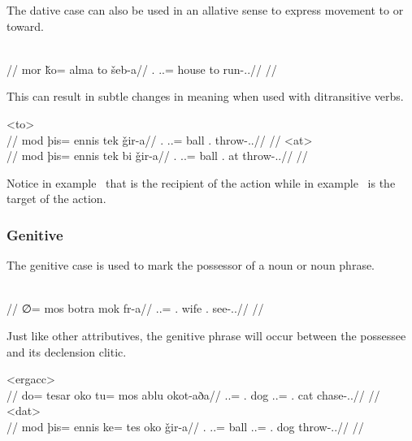 The dative case can also be used in an allative sense to express movement to or toward.

	\begingl
		\glpreamble{}\\
		//
		\gla mor ǩo= alma to šeb-a//
		\glb \Fps.\An{} \In.\Sg.\Dat= house to run-\Ind.\Npst.\Ipfv//
		\glft{}//
	\endgl
\xe

This can result in subtle changes in meaning when used with ditransitive verbs.

	\a<to>\begingl
		\glpreamble{}\\
		//
		\gla mod þis= ennis tek ǧir-a//
		\glb \Fps.\Erg{} \In.\Pc.\Acc= ball \Sps.\Dat{}  throw-\Ind.\Npst.\Ipfv//
		\glft{}//
	\endgl
	\a<at>\begingl
		\glpreamble{}\\
		//
		\gla mod þis= ennis tek bi ǧir-a//
		\glb \Fps.\Erg{} \In.\Pc.\Acc= ball \Sps.\Dat{} at  throw-\Ind.\Npst.\Ipfv//
		\glft{}//
	\endgl
\xe

Notice in example~ that  is the recipient of the action while in example~  is the target of the action.

\subsubsection{Genitive}
\label{subsubsec:tvk-nouns-genitive}

The genitive case is used to mark the possessor of a noun or noun phrase.

	\begingl
		\glpreamble{}\\
		//
		\gla ∅= mos botra mok fr-a//
		\glb \An.\Sg.\Abs= \Fps.\Gen{} wife \Fps.\Dat{} see-\Ind.\Npst.\Ipfv//
		\glft{}//
	\endgl
\xe

Just like other attributives, the genitive phrase will occur between the possessee and its declension clitic.

	\a<ergacc>\begingl
		\glpreamble{}\\
		//
		\gla do= tesar oko tu= mos ablu okot-aða//
		\glb \An.\Sg.\Erg= \Spc.\Gen{} dog \An.\Sg.\Acc= \Fps.\Gen{} cat chase-\Ind.\Pst.\Prg//
		\glft{}//
	\endgl
	\a<dat>\begingl
		\glpreamble{}\\
		//
		\gla mod þis= ennis ke= tes oko ǧir-a//
		\glb \Fps.\Erg{} \In.\Sg.\Acc= ball \An.\Sg.\Dat= \Sps.\Gen{} dog throw-\Ind.\Npst.\Ipfv//
		\glft{}//
	\endgl
\xe

